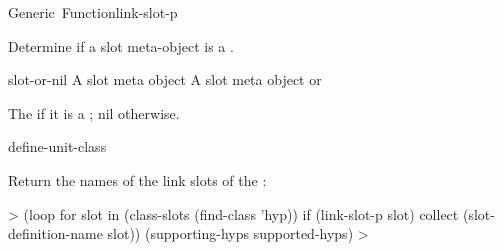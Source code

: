 \documentclass[10pt,twoside,english,pdftex]{article}
\begin{document}

\begin{functiondoc}{Generic~Function}{link-slot-p}{
    }

\fnsyntax

\fnpurpose Determine if a slot meta-object is a .

\fnmethods
{}

\fnpackage {}

\fnmodule {}

\fnargs
\begin{args}{slot-or-nil}
\arg[slot] A slot meta object
 A slot meta object or \nil{}
\end{args}

\fnreturns The  if it is a ; nil otherwise.

\begin{alsos}{define-unit-class}
\end{alsos}

\fnexample
Return the names of the link slots of the  :
%
\W\supp
\begin{example}
  > (loop for slot in (class-slots (find-class 'hyp)) 
       if (link-slot-p slot) collect (slot-definition-name slot))
  (supporting-hyps supported-hyps)
  >
\end{example}

\end{functiondoc}

\end{document}
